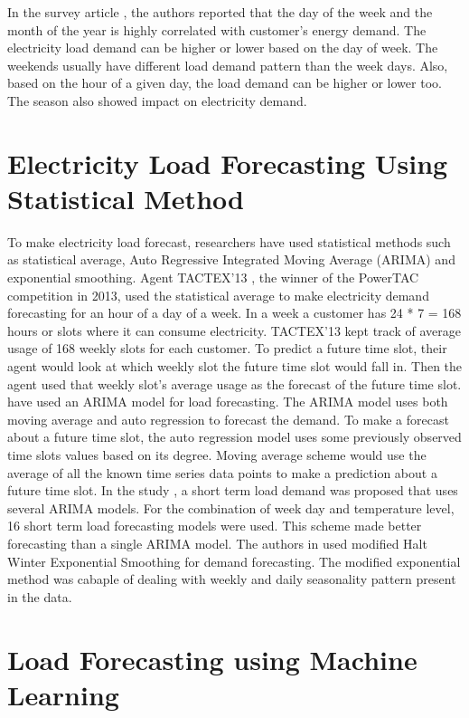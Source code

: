 In the survey article \cite{hahn2009electric}, the authors reported that the day of the week and the month of the year is highly correlated with customer's energy demand. The electricity load demand can be higher or lower based on the day of week. The weekends usually have different load demand pattern than the week days. Also, based on the hour of a given day, the load demand can be higher or lower too. The season also showed impact on electricity demand. 

\section{Electricity Load Forecasting Using Statistical Method}

To make electricity load forecast, researchers have used statistical methods such as statistical average, Auto Regressive Integrated Moving Average (ARIMA) and exponential smoothing.  Agent TACTEX'13 \cite{urieli2014tactex}, the winner of the PowerTAC competition in 2013, used the statistical average to make electricity demand forecasting for an hour of a day of a week. In a week a customer has 24 * 7 = 168 hours or slots where it can consume electricity. TACTEX'13  kept track of average usage of 168 weekly slots for each customer. To predict a future time slot, their agent would look at which weekly slot the future time slot would fall in. Then the agent used that weekly slot's average usage as the forecast of the future time slot. \cite{cho1995customer} have used an ARIMA model for load forecasting. The ARIMA model uses both moving average and auto regression to forecast the demand. To make a forecast about a future time slot, the auto regression model uses some previously observed time slots values based on its degree. Moving average scheme would use the average of all the known time series data points to make a prediction about a future time slot. In the study \cite{amjady2001short}, a short term load demand was proposed that uses several ARIMA models. For the combination of week day and temperature level, 16 short term load forecasting models were used. This scheme made better forecasting than a single ARIMA model. The authors in \cite{jalil2013electricity} used modified Halt Winter Exponential Smoothing for demand forecasting. The modified exponential method was cabaple of dealing with weekly and daily seasonality pattern present in the data.    


\section{Load Forecasting using Machine Learning}

